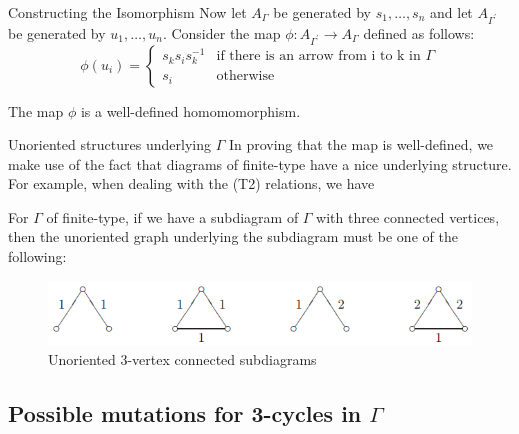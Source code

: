 \documentclass{beamer}
\begin{document}
\begin{frame}{Constructing the Isomorphism}
Now let $A_{\Gamma}$ be generated by $s_{1}, \dots, s_{n}$ and let $A_{\Gamma^{\prime}}$ be generated by $u_{1}, \dots, u_{n}$. Consider the map $\phi: A_{\Gamma^{\prime}} \rightarrow A_{\Gamma}$ defined as follows:
$$\phi(u_{i}) = 
\begin{cases}
s_{k}s_{i}s_{k}^{-1} &\text{if there is an arrow from i to k in $\Gamma$} \\
s_{i} &\text{otherwise}
\end{cases}$$

\begin{lemma}
The map $\phi$ is a well-defined homomomorphism.
\end{lemma}
\end{frame}

\begin{frame}{Unoriented structures underlying $\Gamma$}
In proving that the map is well-defined, we make use of the fact that diagrams of finite-type have a nice underlying structure. For example, when dealing with the (T2) relations, we have
\begin{lemma}
For $\Gamma$ of finite-type, if we have a subdiagram of $\Gamma$ with three connected vertices, then the unoriented graph underlying the subdiagram must be one of the following:
\begin{figure}[h]
\centering
\includegraphics[scale = .65]{3vertconnected.PNG}
\caption{Unoriented 3-vertex connected subdiagrams}
\end{figure}
\end{lemma}

\end{frame}
\subsection{Possible mutations for 3-cycles in $\Gamma$}
\end{document}
